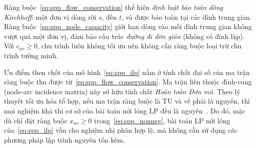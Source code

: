 Ràng buộc~\eqref{eq:spp_flow_conservation} thể hiện \emph{định luật bảo toàn
dòng Kirchhoff}: một đơn vị dòng rời $s$, đến $t$, và được bảo toàn tại các
đỉnh trung gian. Ràng buộc~\eqref{eq:spp_node_capacity} giới hạn dòng vào mỗi
đỉnh trung gian không vượt quá một đơn vị, đảm bảo cấu trúc \emph{đường đi
đơn giản} (không có đỉnh lặp). Với $c_{uv} \geq 0$, chu trình luôn không tối ưu
nên không cần ràng buộc loại trừ chu trình tường minh.

Ưu điểm then chốt của mô hình~\eqref{eq:spp_ilp} nằm ở tính chất đại số của
ma trận ràng buộc thu được từ~\eqref{eq:spp_flow_conservation}.
Ma trận liên thuộc đỉnh-cung (node-arc incidence matrix) này sở hữu tính chất
\emph{Hoàn toàn Đơn mô}.
Theo lý thuyết tối ưu hóa tổ hợp, nếu ma trận ràng buộc là TU và vế phải là
nguyên, thì mọi nghiệm khả thi cơ sở của bài toán nới lỏng LP đều là
nguyên~\cite{AhujaMagnantiOrlin1993}.
Do đó, mặc dù chỉ đặt ràng buộc $x_{uv} \geq 0$ trong~\eqref{eq:spp_nonneg},
bài toán LP nới lỏng của~\eqref{eq:spp_ilp} vẫn cho nghiệm nhị phân hợp lệ,
mà không cần sử dụng các phương pháp lập trình nguyên tốn kém.
